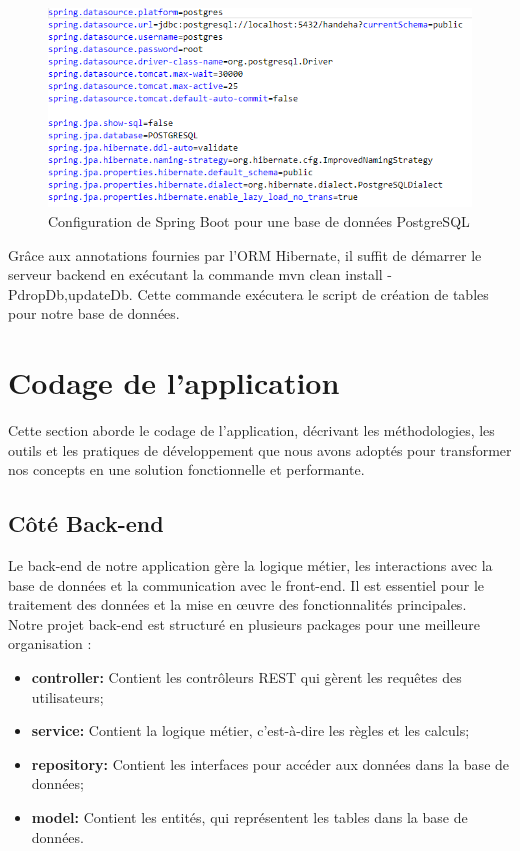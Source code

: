 \documentclass[12pt]{report}
\begin{document}
			\begin{figure}[h]
				\centering
				\includegraphics[width=\textwidth]{appPropPostgre.jpg}
				\caption{Configuration de Spring Boot pour une base de données PostgreSQL}
				\label{fig:appPropPostgre}
			\end{figure}
			\FloatBarrier

			Grâce aux annotations fournies par l'ORM Hibernate, il suffit de démarrer le serveur backend en exécutant la commande mvn clean install -PdropDb,updateDb. Cette commande exécutera le script de création de tables pour notre base de données.


			\section{Codage de l’application}

			\hspace{15pt} Cette section aborde le codage de l'application, décrivant les méthodologies, les outils et les pratiques de développement que nous avons adoptés pour transformer nos concepts en une solution fonctionnelle et performante.

			\subsection{Côté Back-end}
			
			\hspace{15pt} Le back-end de notre application gère la logique métier, les interactions avec la base de données et la communication avec le front-end. Il est essentiel pour le traitement des données et la mise en œuvre des fonctionnalités principales.\\

			Notre projet back-end est structuré en plusieurs packages pour une meilleure organisation :

			\begin{itemize}
				\item \textbf{controller:} Contient les contrôleurs REST qui gèrent les requêtes des utilisateurs;
				\item \textbf{service:} Contient la logique métier, c'est-à-dire les règles et les calculs;
				\item \textbf{repository:} Contient les interfaces pour accéder aux données dans la base de données;
				\item \textbf{model:} Contient les entités, qui représentent les tables dans la base de données.
			\end{itemize}
\end{document}
